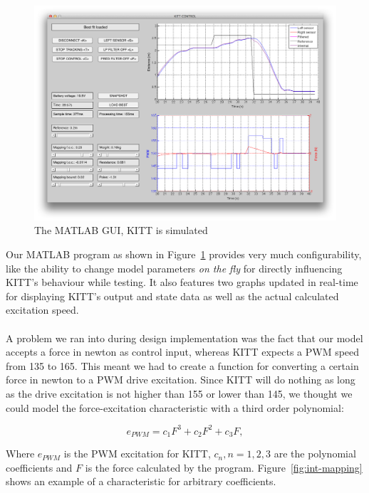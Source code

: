 \documentclass[11pt,titlepage]{report}
\begin{document}
\begin{figure}[H]
	\centering
	\includegraphics[width=\linewidth]{resource/gui-matlab.png}
	\caption{The MATLAB GUI, KITT is simulated}
	\label{fig:int-gui-matlab}
\end{figure}

Our MATLAB program as shown in Figure~\ref{fig:int-gui-matlab} provides very much configurability, like the ability to change model parameters \textit{on the fly} for directly influencing KITT's behaviour while testing. It also features two graphs updated in real-time for displaying KITT's output and state data as well as the actual calculated excitation speed.
\\\\
A problem we ran into during design implementation was the fact that our model accepts a force in newton as control input, whereas KITT expects a PWM speed from \num{135} to \num{165}. This meant we had to create a function for converting a certain force in newton to a PWM drive excitation. Since KITT will do nothing as long as the drive excitation is not higher than 155 or lower than 145, we thought we could model the force-excitation characteristic with a third order polynomial:

\begin{equation}
	e_{PWM} = c_{1}F^3 + c_{2}F^2 + c_{3}F,
\end{equation}

Where $e_{PWM}$ is the PWM excitation for KITT, $c_{n}, n = 1, 2, 3$ are the polynomial coefficients and $F$ is the force calculated by the program. Figure~\ref{fig:int-mapping} shows an example of a characteristic for arbitrary coefficients.
\end{document}

